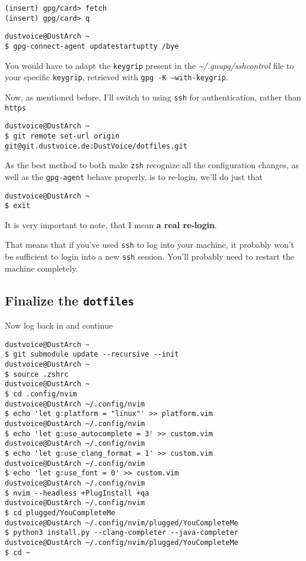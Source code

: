 \documentclass[10pt]{dustdoc}
\begin{document}
\begin{verbatim}
(insert) gpg/card> fetch
(insert) gpg/card> q
\end{verbatim}

\begin{verbatim}
dustvoice@DustArch ~
$ gpg-connect-agent updatestartuptty /bye
\end{verbatim}

\begin{NOTE}
    You would have to adapt the \texttt{keygrip} present in the \textit{\~{}/.gnupg/sshcontrol} file to your specific \texttt{keygrip}, retrieved with \texttt{gpg -K --with-keygrip}.
\end{NOTE}

Now, as mentioned before, I’ll switch to using \texttt{ssh} for authentication, rather than \texttt{https}

\begin{verbatim}
dustvoice@DustArch ~
$ git remote set-url origin git@git.dustvoice.de:DustVoice/dotfiles.git
\end{verbatim}

As the best method to both make \texttt{zsh} recognize all the configuration changes, as well as the \texttt{gpg-agent} behave properly, is to re-login, we’ll do just that

\begin{verbatim}
dustvoice@DustArch ~
$ exit
\end{verbatim}

\begin{WARNING}
    It is very important to note, that I mean \textbf{a real re-login}.

    That means that if you’ve used \texttt{ssh} to log into your machine, it probably won’t be sufficient to login into a new \texttt{ssh} session.
    You’ll probably need to restart the machine completely.
\end{WARNING}

\subsection{Finalize the \texttt{dotfiles}}
\label{sec:finalize-the-dotfiles}

Now log back in and continue

\begin{verbatim}
dustvoice@DustArch ~
$ git submodule update --recursive --init
dustvoice@DustArch ~
$ source .zshrc
dustvoice@DustArch ~
$ cd .config/nvim
dustvoice@DustArch ~/.config/nvim
$ echo 'let g:platform = "linux"' >> platform.vim
dustvoice@DustArch ~/.config/nvim
$ echo 'let g:use_autocomplete = 3' >> custom.vim
dustvoice@DustArch ~/.config/nvim
$ echo 'let g:use_clang_format = 1' >> custom.vim
dustvoice@DustArch ~/.config/nvim
$ echo 'let g:use_font = 0' >> custom.vim
dustvoice@DustArch ~/.config/nvim
$ nvim --headless +PlugInstall +qa
dustvoice@DustArch ~/.config/nvim
$ cd plugged/YouCompleteMe
dustvoice@DustArch ~/.config/nvim/plugged/YouCompleteMe
$ python3 install.py --clang-completer --java-completer
dustvoice@DustArch ~/.config/nvim/plugged/YouCompleteMe
$ cd ~
\end{verbatim}
\end{document}
